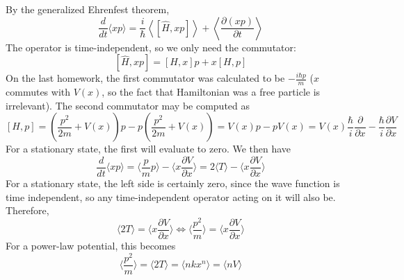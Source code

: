\documentclass{article}
\begin{document}
\section{}
By the generalized Ehrenfest theorem,
\[
  \frac{d}{dt}\langle xp \rangle
  =\frac{i}{\hbar}\left\langle \left[ \hat{H},xp \right]\right\rangle+\left\langle \frac{\partial (xp)}{\partial t}\right\rangle
\]
The operator is time-independent, so we only need the commutator:
\[
  [\hat{H},xp]=[H,x]p+x[H,p]
\]
On the last homework, the first commutator was calculated to be $-\frac{i\hbar p}{m}$ ($x$ commutes with $V(x)$, so the fact that Hamiltonian was a free particle is irrelevant).
The second commutator may be computed as
\[[H,p]=(\frac{p^{2}}{2m}+V(x))p-p(\frac{p^{2}}{2m}+V(x))=V(x)p-pV(x)=V(x)\frac{\hbar}{i}\frac{\partial}{\partial x}-\frac{\hbar}{i}\frac{\partial V}{\partial x}\]
For a stationary state, the first will evaluate to zero.
We then have
\[
  \frac{d}{dt}\langle xp \rangle=\langle \frac{p}{m}p \rangle-\langle x\frac{\partial V}{\partial x} \rangle=2\langle T \rangle-\langle x\frac{\partial V}{\partial x} \rangle
\]
For a stationary state, the left side is certainly zero, since the wave function is time independent, so any time-independent operator acting on it will also be.
Therefore,
\[\langle 2T \rangle=\langle x\frac{\partial V}{\partial x} \rangle\Leftrightarrow \langle \frac{p^{2}}{m} \rangle=\langle x\frac{\partial V}{\partial x} \rangle\]
For a power-law potential, this becomes
\[\langle \frac{p^{2}}{m} \rangle=\langle 2T \rangle=\langle nkx^{n} \rangle=\langle nV  \rangle\]
\end{document}
